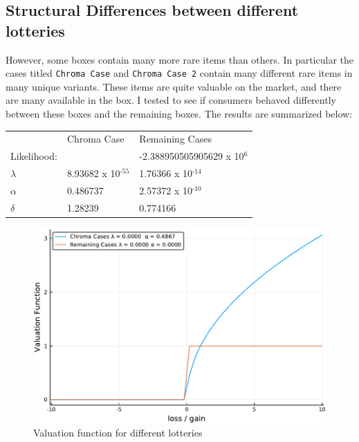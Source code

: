 \documentclass[12pt, letterpaper]{paper}
\begin{document}
\subsection{Structural Differences between different lotteries}
\label{sec-5-1}

However, some boxes contain many more rare items than others. In
particular the cases titled \texttt{Chroma Case} and \texttt{Chroma Case 2} contain
many different rare items in many unique variants. These items are
quite valuable on the market, and there are many available in
the box. I tested to see if consumers behaved differently between
these boxes and the remaining boxes. The results are summarized below:

\begin{center}
\begin{tabular}{lll}
 & Chroma Case & Remaining Cases\\
Likelihood: &  & -2.388950505905629 x 10$^{\text{6}}$\\
$\lambda$ & 8.93682 x 10$^{\text{-55}}$ & 1.76366 x 10$^{\text{-14}}$\\
$\alpha$ & 0.486737 & 2.57372 x 10$^{\text{-10}}$\\
$\delta$ & 1.28239 & 0.774166\\
\end{tabular}
\end{center}

\begin{figure}[htb]
\centering
\includegraphics[width=.9\linewidth]{../Scripts/ValuationDual.pdf}
\caption{\label{fig:double-valuation}Valuation function for different lotteries}
\end{figure}
\end{document}
